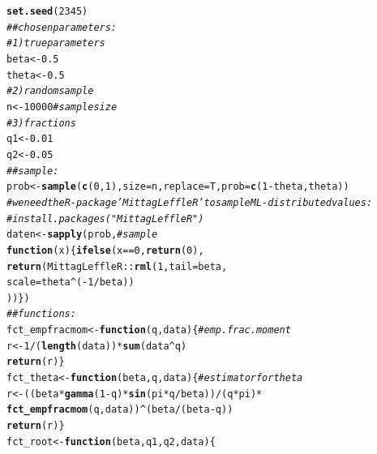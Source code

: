 \documentclass[10pt, a4paper]{article}\usepackage[]{graphicx}\usepackage[]{color}
\makeatletter
\newcommand{\hlnum}[1]{\textcolor[rgb]{0.686,0.059,0.569}{#1}}%
\newcommand{\hlcom}[1]{\textcolor[rgb]{0.678,0.584,0.686}{\textit{#1}}}%
\newcommand{\hlopt}[1]{\textcolor[rgb]{0,0,0}{#1}}%
\newcommand{\hlstd}[1]{\textcolor[rgb]{0.345,0.345,0.345}{#1}}%
\newcommand{\hlkwa}[1]{\textcolor[rgb]{0.161,0.373,0.58}{\textbf{#1}}}%
\newcommand{\hlkwb}[1]{\textcolor[rgb]{0.69,0.353,0.396}{#1}}%
\newcommand{\hlkwc}[1]{\textcolor[rgb]{0.333,0.667,0.333}{#1}}%
\newcommand{\hlkwd}[1]{\textcolor[rgb]{0.737,0.353,0.396}{\textbf{#1}}}%
\newenvironment{kframe}{%
 \def\at@end@of@kframe{}%
 \ifinner\ifhmode%
  \def\at@end@of@kframe{\end{minipage}}%
  \begin{minipage}{\columnwidth}%
 \fi\fi%
 \def\FrameCommand##1{\hskip\@totalleftmargin \hskip-\fboxsep
 \colorbox{shadecolor}{##1}\hskip-\fboxsep
     \hskip-\linewidth \hskip-\@totalleftmargin \hskip\columnwidth}%
 \MakeFramed {\advance\hsize-\width
   \@totalleftmargin\z@ \linewidth\hsize
   \@setminipage}}%
 {\par\unskip\endMakeFramed%
 \at@end@of@kframe}
\newenvironment{knitrout}{}{} %
\makeatother
\begin{document}
\begin{knitrout}
\color{fgcolor}\begin{kframe}
\begin{alltt}
\hlkwd{set.seed}\hlstd{(}\hlnum{2345}\hlstd{)}
\hlcom{## chosen parameters:}
\hlcom{# 1) true parameters}
\hlstd{beta} \hlkwb{<-} \hlnum{0.5}
\hlstd{theta} \hlkwb{<-} \hlnum{0.5}
\hlcom{# 2) random sample}
\hlstd{n} \hlkwb{<-} \hlnum{10000}                                   \hlcom{# sample size}
\hlcom{# 3) fractions}
\hlstd{q1} \hlkwb{<-} \hlnum{0.01}
\hlstd{q2} \hlkwb{<-} \hlnum{0.05}
\hlcom{## sample:}
\hlstd{prob} \hlkwb{<-} \hlkwd{sample}\hlstd{(} \hlkwd{c}\hlstd{(}\hlnum{0}\hlstd{,}\hlnum{1}\hlstd{) ,} \hlkwc{size} \hlstd{= n ,} \hlkwc{replace} \hlstd{= T ,} \hlkwc{prob} \hlstd{=} \hlkwd{c}\hlstd{(}\hlnum{1}\hlopt{-}\hlstd{theta , theta))}
\hlcom{# we need the R-package 'MittagLeffleR' to sample ML-distributed values:}
\hlcom{# install.packages("MittagLeffleR") }
\hlstd{daten} \hlkwb{<-} \hlkwd{sapply}\hlstd{(prob ,}                       \hlcom{# sample}
                \hlkwa{function}\hlstd{(}\hlkwc{x}\hlstd{)\{} \hlkwd{ifelse}\hlstd{( x} \hlopt{==} \hlnum{0} \hlstd{,} \hlkwd{return}\hlstd{(}\hlnum{0}\hlstd{) ,}
                        \hlkwd{return}\hlstd{( MittagLeffleR}\hlopt{::}\hlkwd{rml}\hlstd{(}\hlnum{1} \hlstd{,} \hlkwc{tail} \hlstd{= beta ,}
                        \hlkwc{scale} \hlstd{= theta}\hlopt{^}\hlstd{(}\hlopt{-}\hlnum{1}\hlopt{/}\hlstd{beta))}
                        \hlstd{) ) \} )}
\hlcom{## functions:}
\hlstd{fct_empfracmom} \hlkwb{<-} \hlkwa{function}\hlstd{(} \hlkwc{q} \hlstd{,} \hlkwc{data} \hlstd{)\{}       \hlcom{# emp. frac. moment}
                \hlstd{r} \hlkwb{<-} \hlnum{1}\hlopt{/}\hlstd{(}\hlkwd{length}\hlstd{(data))}\hlopt{*}\hlkwd{sum}\hlstd{(data}\hlopt{^}\hlstd{q)}
                \hlkwd{return}\hlstd{(r)       \}}
\hlstd{fct_theta} \hlkwb{<-} \hlkwa{function}\hlstd{(} \hlkwc{beta} \hlstd{,} \hlkwc{q} \hlstd{,} \hlkwc{data} \hlstd{)\{}     \hlcom{# estimator for theta}
                \hlstd{r} \hlkwb{<-} \hlstd{( ( beta}\hlopt{*}\hlkwd{gamma}\hlstd{(}\hlnum{1}\hlopt{-}\hlstd{q)}\hlopt{*}\hlkwd{sin}\hlstd{(pi}\hlopt{*}\hlstd{q}\hlopt{/}\hlstd{beta) )}\hlopt{/}\hlstd{( q}\hlopt{*}\hlstd{pi )}\hlopt{*}
                \hlkwd{fct_empfracmom}\hlstd{(q , data) )}\hlopt{^}\hlstd{(beta}\hlopt{/}\hlstd{(beta}\hlopt{-}\hlstd{q))}
                \hlkwd{return}\hlstd{(r)               \}}
\hlstd{fct_root} \hlkwb{<-} \hlkwa{function}\hlstd{(} \hlkwc{beta} \hlstd{,} \hlkwc{q1} \hlstd{,} \hlkwc{q2} \hlstd{,} \hlkwc{data}\hlstd{)\{}

\end{alltt}
\end{kframe}
\end{knitrout}
\end{document}
